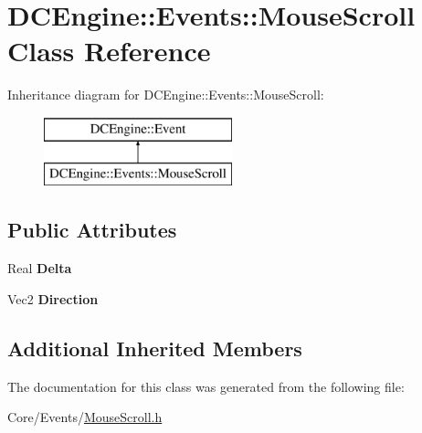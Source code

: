 \hypertarget{classDCEngine_1_1Events_1_1MouseScroll}{\section{D\-C\-Engine\-:\-:Events\-:\-:Mouse\-Scroll Class Reference}
\label{classDCEngine_1_1Events_1_1MouseScroll}
}
Inheritance diagram for D\-C\-Engine\-:\-:Events\-:\-:Mouse\-Scroll\-:\begin{figure}[H]
\begin{center}
\leavevmode
\includegraphics[height=2.000000cm]{classDCEngine_1_1Events_1_1MouseScroll}
\end{center}
\end{figure}
\subsection*{Public Attributes}
\begin{DoxyCompactItemize}
\item 
\hypertarget{classDCEngine_1_1Events_1_1MouseScroll_a3979e3355a9fa55d90fdf0995a407c29}{Real {\bfseries Delta}}\label{classDCEngine_1_1Events_1_1MouseScroll_a3979e3355a9fa55d90fdf0995a407c29}

\item 
\hypertarget{classDCEngine_1_1Events_1_1MouseScroll_a86b3589a2661f1c12884241f5cfce01c}{Vec2 {\bfseries Direction}}\label{classDCEngine_1_1Events_1_1MouseScroll_a86b3589a2661f1c12884241f5cfce01c}

\end{DoxyCompactItemize}
\subsection*{Additional Inherited Members}


The documentation for this class was generated from the following file\-:\begin{DoxyCompactItemize}
\item 
Core/\-Events/\hyperlink{MouseScroll_8h}{Mouse\-Scroll.\-h}\end{DoxyCompactItemize}
